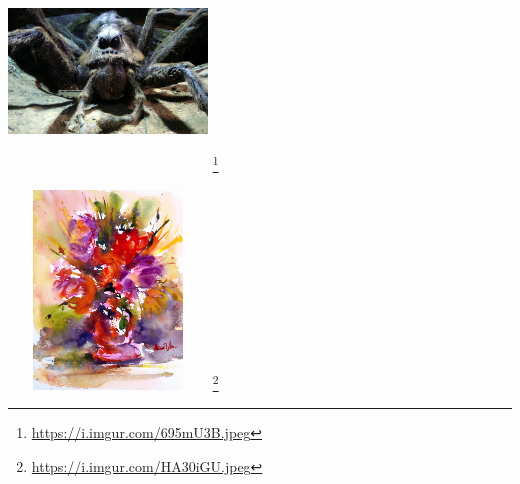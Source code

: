 \begin{multicols}{2}
    \begin{center}
        \captionsetup{type=figure}
        \includegraphics[width=200px, height=200px]{images/aragog.jpeg}
        \footnote{\href{https://i.imgur.com/695mU3B.jpeg}{https://i.imgur.com/695mU3B.jpeg}}
    \end{center}
    \begin{center}
        \captionsetup{type=figure}
        \includegraphics[width=200px, height=200px]{images/bouquet.jpeg}
        \footnote{\href{https://i.imgur.com/HA30iGU.jpeg}{https://i.imgur.com/HA30iGU.jpeg}}
    \end{center}
\end{multicols}

